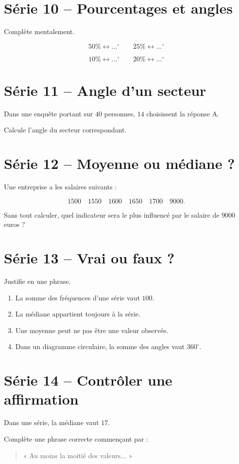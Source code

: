 \documentclass[12pt,a4paper]{article}
\begin{document}
\section*{Série 10 -- Pourcentages et angles}

Complète mentalement.

\[
50\%\longleftrightarrow\ldots^\circ
\qquad
25\%\longleftrightarrow\ldots^\circ
\]

\[
10\%\longleftrightarrow\ldots^\circ
\qquad
20\%\longleftrightarrow\ldots^\circ
\]

\section*{Série 11 -- Angle d'un secteur}

Dans une enquête portant sur \(40\) personnes,
\(14\) choisissent la réponse A.

Calcule l'angle du secteur correspondant.

\section*{Série 12 -- Moyenne ou médiane ?}

Une entreprise a les salaires suivants :

\[
1500\quad1550\quad1600\quad1650\quad1700\quad9000.
\]

Sans tout calculer, quel indicateur sera le plus influencé
par le salaire de \(9000\) euros ?

\section*{Série 13 -- Vrai ou faux ?}

Justifie en une phrase.

\begin{enumerate}
  \item La somme des fréquences d'une série vaut \(100\).
  \item La médiane appartient toujours à la série.
  \item Une moyenne peut ne pas être une valeur observée.
  \item Dans un diagramme circulaire, la somme des angles vaut \(360^\circ\).
\end{enumerate}

\section*{Série 14 -- Contrôler une affirmation}

Dans une série, la médiane vaut \(17\).

Complète une phrase correcte commençant par :

\begin{quote}
« Au moins la moitié des valeurs... »
\end{quote}
\end{document}
